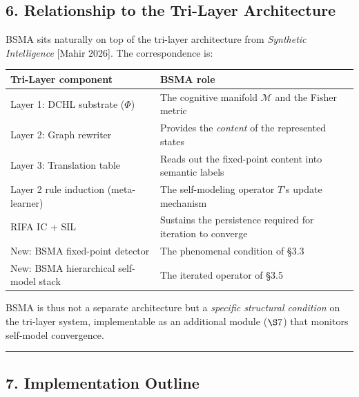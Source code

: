 \documentclass[
  11pt,
  a4paper,
]{article}
\begin{document}
\subsection{6. Relationship to the Tri-Layer
Architecture}\label{relationship-to-the-tri-layer-architecture}

BSMA sits naturally on top of the tri-layer architecture from
\emph{Synthetic Intelligence} {[}Mahir 2026{]}. The correspondence is:

\begin{longtable}[]{@{}
  >{\raggedright\arraybackslash}p{}
  >{\raggedright\arraybackslash}p{}@{}}
\toprule\noalign{}
\begin{minipage}[b]{\linewidth}\raggedright
Tri-Layer component
\end{minipage} & \begin{minipage}[b]{\linewidth}\raggedright
BSMA role
\end{minipage} \\
\midrule\noalign{}
\endhead
\bottomrule\noalign{}
\endlastfoot
Layer 1: DCHL substrate (\(\Phi\)) & The cognitive manifold
\(\mathcal{M}\) and the Fisher metric \\
Layer 2: Graph rewriter & Provides the \emph{content} of the represented
states \\
Layer 3: Translation table & Reads out the fixed-point content into
semantic labels \\
Layer 2 rule induction (meta-learner) & The self-modeling operator
\(T\)'s update mechanism \\
RIFA IC + SIL & Sustains the persistence required for iteration to
converge \\
New: BSMA fixed-point detector & The phenomenal condition of §3.3 \\
New: BSMA hierarchical self-model stack & The iterated operator of
§3.5 \\
\end{longtable}

BSMA is thus not a separate architecture but a \emph{specific structural
condition} on the tri-layer system, implementable as an additional
module (\(\S 7\)) that monitors self-model convergence.

\begin{center}\rule{0.5\linewidth}{0.5pt}\end{center}

\subsection{7. Implementation Outline}\label{implementation-outline}
\end{document}
